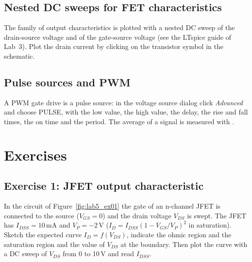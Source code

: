 
\subsection{Nested DC sweeps for FET characteristics}
The family of output characteristics is plotted with a nested DC sweep of the drain-source voltage and of the gate-source voltage (see the LTspice guide of Lab~3). Plot the drain current by clicking on the transistor symbol in the schematic.


\subsection{Pulse sources and PWM}
A PWM gate drive is a pulse source: in the voltage source dialog click \textit{Advanced} and choose PULSE, with the low value, the high value, the delay, the rise and fall times, the on time and the period. The average of a signal is measured with .

\section{Exercises}

\subsection{Exercise 1: JFET output characteristic}
In the circuit of Figure~\ref{fig:lab5_ex01} the gate of an n-channel JFET is connected to the source ($V_{GS}=0$) and the drain voltage $V_{DS}$ is swept. The JFET has $I_{DSS}=10$\,mA and $V_P=-2$\,V ($I_D=I_{DSS}(1-V_{GS}/V_P)^2$ in saturation). Sketch the expected curve $I_D=f(V_{DS})$, indicate the ohmic region and the saturation region and the value of $V_{DS}$ at the boundary. Then plot the curve with a DC sweep of $V_{DS}$ from 0 to 10\,V and read $I_{DSS}$.




